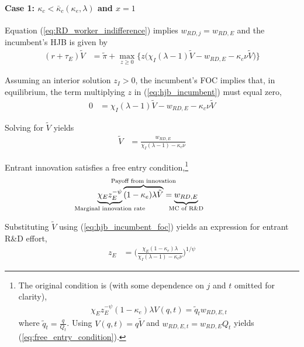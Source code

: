 \documentclass[11pt,english]{article}
\theoremstyle{remark}
\begin{document}
\paragraph{Case 1: $\kappa_c < \bar{\kappa}_c(\kappa_e,\lambda)$ and $x = 1$}

Equation (\ref{eq:RD_worker_indifference}) implies $w_{RD,j} = w_{RD,E}$ and the incumbent's HJB is given by 
\begin{align}
(r + \tau_E) \tilde{V} &= \tilde{\pi} + \max_{z \ge 0} \Big\{z \big(\chi_I (\lambda - 1) \tilde{V} - w_{RD,E} - \kappa_{c} \nu \tilde{V}\big) \Big\} \label{eq:hjb_incumbent}
\end{align}

Assuming an interior solution $z_I > 0$, the incumbent's FOC implies that, in equilibrium, the term multiplying $z$ in (\ref{eq:hjb_incumbent}) must equal zero,
\begin{align*}
	0 &= \chi_I(\lambda-1)\tilde{V}- w_{RD,E} - \kappa_c \nu \tilde{V}
\end{align*}

Solving for $\tilde{V}$ yields
\begin{align}
	\tilde{V} &= \frac{w_{RD,E}}{\chi_I(\lambda - 1) - \kappa_{c} \nu} \label{eq:hjb_incumbent_foc}
\end{align}

Entrant innovation satisfies a free entry condition,\footnote{The original condition is (with some dependence on $j$ and $t$ omitted for clarity), 
	\begin{align*}
		\chi_E z_E^{-\psi} (1-\kappa_e) \lambda V(q,t) = \tilde{q}_t w_{RD,E,t}
	\end{align*}
	where $\tilde{q}_t = \frac{q}{Q_t}$. Using $V(q,t) = q \tilde{V}$ and $w_{RD,E,t} = w_{RD,E} Q_t$ yields (\ref{eq:free_entry_condition}).}
\begin{align}
	\underbrace{\chi_E z_E^{-\psi}}_{\mathclap{\text{Marginal innovation rate}}} \overbrace{(1-\kappa_e) \lambda \tilde{V}}^{\mathclap{\text{Payoff from innovation}}} &= \underbrace{w_{RD,E}}_{\mathclap{\text{MC of R\&D}}} \label{eq:free_entry_condition}
\end{align}

Substituting $\tilde{V}$ using (\ref{eq:hjb_incumbent_foc}) yields an expression for entrant R\&D effort, 
\begin{align}
	z_E &= \Big( \frac{\chi_E (1-\kappa_{e}) \lambda}{\chi_I(\lambda-1) - \kappa_c \nu } \Big)^{1/\psi} \label{eq:effort_entrant}
\end{align}
\end{document}
